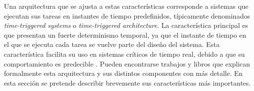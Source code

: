 Una arquitectura que se ajusta a estas características corresponde a sistemas que ejecutan sus tareas en instantes de tiempo predefinidos, típicamente denominados \textit{time-triggered systems} o \textit{time-triggered architecture}. La característica principal es que presentan un fuerte determinismo temporal, ya que el instante de tiempo en el que se ejecuta cada tarea se vuelve parte del diseño del sistema. Esta característica facilita su uso en sistemas críticos de tiempo real, debido a que su comportamiento es predecible \cite[p.~12]{pont2008patterns}. Pueden encontrarse trabajos \cite{kopetz2003time} \cite{kopetz1998time} y libros \cite{kopetz-2011} \cite{pont2008patterns} que explican formalmente esta arquitectura y sus distintos componentes con más detalle. En esta sección se pretende describir brevemente sus características más importantes.






